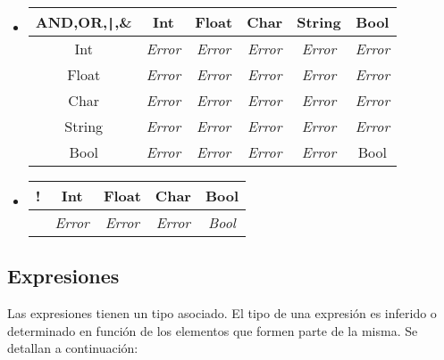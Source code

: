 \documentclass[12pt, spanish]{report}
\begin{document}
\begin{itemize}
\item
\begin{tabular}{|c||ccccc|}
	    \hline
AND,OR,\texttt{|},\& &  Int  & Float & Char & String & Bool  \\ 
	    \hline \hline
Int         & \emph{Error} & \emph{Error} & \emph{Error} & \emph{Error} & \emph{Error} \\
Float       & \emph{Error} & \emph{Error} & \emph{Error} & \emph{Error} & \emph{Error} \\
Char        & \emph{Error} & \emph{Error} & \emph{Error} & \emph{Error} & \emph{Error} \\
String      & \emph{Error} & \emph{Error} & \emph{Error} & \emph{Error} & \emph{Error} \\
Bool        & \emph{Error} & \emph{Error} & \emph{Error} & \emph{Error} & Bool \\
	\hline
\end{tabular}

\item
\begin{tabular}{|c||cccc|}
 \hline
!       &  Int  & Float & Char  & Bool  \\ 
 \hline \hline
        & \emph{Error} & \emph{Error} & \emph{Error} & \emph{Bool} \\
	\hline
\end{tabular}
\end{itemize}

\subsection{Expresiones}
\label{sec:expr}

Las expresiones tienen un tipo asociado. El tipo de una expresi\'on es
inferido o determinado en funci\'on de los elementos que formen parte
de la misma. Se detallan a continuaci\'on:
\end{document}
